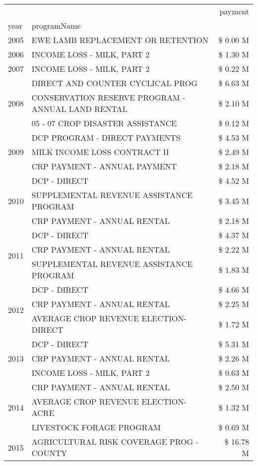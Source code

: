 \begin{tabular}{llr}
\toprule
 &  & payment \\
year & programName &  \\
\midrule
2005 & EWE LAMB REPLACEMENT OR RETENTION & \$ 0.00 M \\
\cline{1-3}
2006 & INCOME LOSS - MILK, PART 2 & \$ 1.30 M \\
\cline{1-3}
2007 & INCOME LOSS - MILK, PART 2 & \$ 0.22 M \\
\cline{1-3}
\multirow[t]{3}{*}{2008} & DIRECT AND COUNTER CYCLICAL PROG & \$ 6.63 M \\
 & CONSERVATION RESERVE PROGRAM - ANNUAL LAND RENTAL & \$ 2.10 M \\
 & 05 - 07 CROP DISASTER ASSISTANCE & \$ 0.12 M \\
\cline{1-3}
\multirow[t]{3}{*}{2009} & DCP PROGRAM - DIRECT PAYMENTS & \$ 4.53 M \\
 & MILK INCOME LOSS CONTRACT II & \$ 2.49 M \\
 & CRP PAYMENT - ANNUAL PAYMENT & \$ 2.18 M \\
\cline{1-3}
\multirow[t]{3}{*}{2010} & DCP - DIRECT & \$ 4.52 M \\
 & SUPPLEMENTAL REVENUE ASSISTANCE PROGRAM & \$ 3.45 M \\
 & CRP PAYMENT - ANNUAL RENTAL & \$ 2.18 M \\
\cline{1-3}
\multirow[t]{3}{*}{2011} & DCP - DIRECT & \$ 4.37 M \\
 & CRP PAYMENT - ANNUAL RENTAL & \$ 2.22 M \\
 & SUPPLEMENTAL REVENUE ASSISTANCE PROGRAM & \$ 1.83 M \\
\cline{1-3}
\multirow[t]{3}{*}{2012} & DCP - DIRECT & \$ 4.66 M \\
 & CRP PAYMENT - ANNUAL RENTAL & \$ 2.25 M \\
 & AVERAGE CROP REVENUE ELECTION-DIRECT & \$ 1.72 M \\
\cline{1-3}
\multirow[t]{3}{*}{2013} & DCP - DIRECT & \$ 5.31 M \\
 & CRP PAYMENT - ANNUAL RENTAL & \$ 2.26 M \\
 & INCOME LOSS - MILK, PART 2 & \$ 0.63 M \\
\cline{1-3}
\multirow[t]{3}{*}{2014} & CRP PAYMENT - ANNUAL RENTAL & \$ 2.50 M \\
 & AVERAGE CROP REVENUE ELECTION-ACRE & \$ 1.32 M \\
 & LIVESTOCK FORAGE PROGRAM & \$ 0.69 M \\
\cline{1-3}
\multirow[t]{3}{*}{2015} & AGRICULTURAL RISK COVERAGE PROG - COUNTY & \$ 16.78 M \\

\end{tabular}

